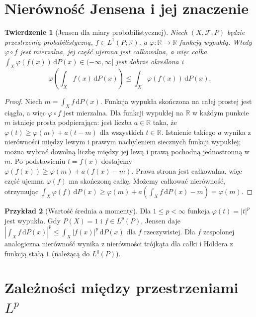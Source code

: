 \documentclass[11pt,a4paper,oneside]{book}
\numberwithin{equation}{chapter}
\theoremstyle{plain}
\newtheorem{twierdzenie}{Twierdzenie}[chapter]
\theoremstyle{definition}
\newtheorem{przyklad}[twierdzenie]{Przykład}
\theoremstyle{remark}
\begin{document}
\section{Nierówność Jensena i jej znaczenie}
\begin{twierdzenie}[Jensen dla miary probabilistycznej]
\label{thm:jensen-14}
Niech $(X,\mathcal F,P)$ będzie przestrzenią
probabilistyczną, $f\in L^1(P;\mathbb R)$,
a $\varphi:\mathbb R\to\mathbb R$ funkcją wypukłą.
Wtedy $\varphi\circ f$ jest mierzalna, jej część ujemna
jest całkowalna, a więc całka
$\int_X\varphi(f(x))\,\mathrm dP(x)\in(-\infty,\infty]$
jest dobrze określona i
\begin{equation}\label{eq:jensen-14}
\varphi\left(\int_Xf(x)\,\mathrm dP(x)\right)
\le\int_X\varphi(f(x))\,\mathrm dP(x).
\end{equation}
\end{twierdzenie}
\begin{proof}
Niech $m=\int_Xf\,\mathrm dP(x)$.
Funkcja wypukła skończona na całej prostej jest ciągła,
a więc $\varphi\circ f$ jest mierzalna.
Dla funkcji wypukłej na $\mathbb R$ w każdym punkcie $m$
istnieje prosta podpierająca: jest liczba $a\in\mathbb R$
taka, że $\varphi(t)\ge\varphi(m)+a(t-m)$
dla wszystkich $t\in\mathbb R$.
Istnienie takiego $a$ wynika z nierówności między
lewym i prawym nachyleniem siecznych funkcji wypukłej;
można wybrać dowolną liczbę między jej lewą
i prawą pochodną jednostronną w $m$.
Po podstawieniu $t=f(x)$ dostajemy
$\varphi(f(x))\ge\varphi(m)+a(f(x)-m)$.
Prawa strona jest całkowalna, więc część ujemna
$\varphi(f)$ ma skończoną całkę. Możemy całkować
nierówność, otrzymując
$\int_X\varphi(f)\,\mathrm dP(x)
\ge\varphi(m)+a(\int_Xf\,\mathrm dP(x)-m)=\varphi(m)$.
\end{proof}

\begin{przyklad}[Wartość średnia a momenty]
Dla $1\le p<\infty$ funkcja $\varphi(t)=|t|^p$
jest wypukła. Gdy $P(X)=1$ i $f\in L^p(P)$,
Jensen daje
$|\int_X f\,\mathrm dP(x)|^p\le
\int_X|f(x)|^p\,\mathrm dP(x)$ dla $f$ rzeczywistej.
Dla $f$ zespolonej analogiczna nierówność wynika
z nierówności trójkąta dla całki i Höldera
z funkcją stałą $1$ (należącą do $L^q(P)$).
\end{przyklad}

\section{Zależności między przestrzeniami $L^p$}
\end{document}
